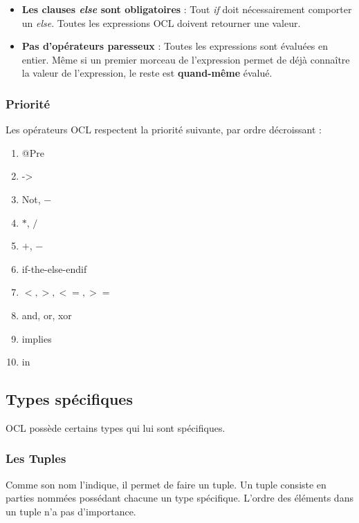 \documentclass[../Syllabus.tex]{subfiles}
\begin{document}
\begin{warningblock}
	\begin{itemize}
		\item \textbf{Les clauses \textit{else} sont obligatoires} : Tout \textit{if} doit nécessairement comporter un \textit{else}. Toutes les expressions OCL doivent retourner une valeur.
		\item \textbf{Pas d'opérateurs paresseux} : Toutes les expressions sont évaluées en entier. Même si un premier morceau de l'expression permet de déjà connaître la valeur de l'expression, le reste est \textbf{quand-même} évalué.
	\end{itemize}
\end{warningblock}

\subsubsection{Priorité}

Les opérateurs OCL respectent la priorité suivante, par ordre décroissant :

\begin{enumerate}
	\item @Pre
	\item ->
	\item Not, $-$
	\item $*$, $/$
	\item $+$, $-$
	\item if-the-else-endif
	\item $<,>,<=,>=$
	\item and, or, xor
	\item implies
	\item in
\end{enumerate}

\subsection{Types spécifiques}

OCL possède certains types qui lui sont spécifiques.

\subsubsection{Les Tuples}

Comme son nom l'indique, il permet de faire un tuple. Un tuple consiste en parties nommées possédant chacune un type spécifique. L'ordre des éléments dans un tuple n'a pas d'importance.
\end{document}
